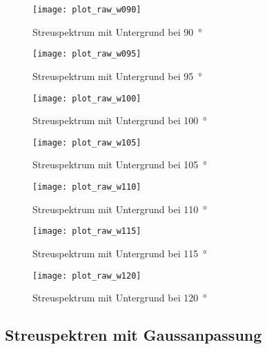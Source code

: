 \documentclass[11pt, ngerman, fleqn, DIV=15, headinclude, BCOR=2cm]{scrreprt}
\begin{document}
\begin{appendix}
\begin{figure}[h]
    \centering
    \texttt{[image: plot\_raw\_w090]}
    \caption{%
	    Streuspektrum mit Untergrund bei \SI{90}{\degree}
    }
    \label{fig:plot_raw_w090}
\end{figure}

\begin{figure}[h]
    \centering
    \texttt{[image: plot\_raw\_w095]}
    \caption{%
	    Streuspektrum mit Untergrund bei \SI{95}{\degree}
    }
    \label{fig:plot_raw_w095}
\end{figure}

\begin{figure}[h]
    \centering
    \texttt{[image: plot\_raw\_w100]}
    \caption{%
	    Streuspektrum mit Untergrund bei \SI{100}{\degree}
    }
    \label{fig:plot_raw_w100}
\end{figure}

\begin{figure}[h]
    \centering
    \texttt{[image: plot\_raw\_w105]}
    \caption{%
	    Streuspektrum mit Untergrund bei \SI{105}{\degree}
    }
    \label{fig:plot_raw_w105}
\end{figure}

\begin{figure}[h]
    \centering
    \texttt{[image: plot\_raw\_w110]}
    \caption{%
	    Streuspektrum mit Untergrund bei \SI{110}{\degree}
    }
    \label{fig:plot_raw_w110}
\end{figure}

\begin{figure}[h]
    \centering
    \texttt{[image: plot\_raw\_w115]}
    \caption{%
	    Streuspektrum mit Untergrund bei \SI{115}{\degree}
    }
    \label{fig:plot_raw_w115}
\end{figure}

\begin{figure}[h]
    \centering
    \texttt{[image: plot\_raw\_w120]}
    \caption{%
	    Streuspektrum mit Untergrund bei \SI{120}{\degree}
    }
    \label{fig:plot_raw_w120}
\end{figure}

\clearpage

\subsection{Streuspektren mit Gaussanpassung}
\label{anhang-streuspektren-gauss}


\end{appendix}
\end{document}
